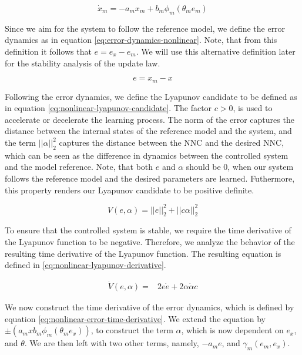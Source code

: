 \begin{equation}
    \dot x_m = -a_mx_m + b_m\phi_m(\theta_m e_m)
    \label{eq:first-order-ref}
\end{equation}

Since we aim for the system to follow the reference model, we define the error dynamics as in equation \eqref{eq:error-dynamics-nonlinear}. Note, that from this definition it follows that $e=e_x-e_m$. We will use this alternative definition later for the stability analysis of the update law.

\begin{equation}
    e=x_m-x
    \label{eq:error-dynamics-nonlinear}
\end{equation}

Following the error dynamics, we define the Lyapunov candidate to be defined as in equation \eqref{eq:nonlinear-lyapunov-candidate}. The factor $c>0$, is used to accelerate or decelerate the learning process. The norm of the error captures the distance between the internal states of the reference model and the system, and the term $||\alpha||_2^2$ captures the distance between the NNC and the desired NNC, which can be seen as the difference in dynamics between the controlled system and the model reference. Note, that both $e$ and $\alpha$ should be $0$, when our system follows the reference model and the desired parameters are learned. Futhermore, this property renders our Lyapunov candidate to be positive definite.

\begin{equation}
    V(e, \alpha) =||e||_2^2 + ||c \alpha||_2^2
    \label{eq:nonlinear-lyapunov-candidate}
\end{equation}

To ensure that the controlled system is stable, we require the time derivative of the Lyapunov function to be negative. Therefore, we analyze the behavior of the resulting time derivative of the Lyapunov function. The resulting equation is defined in \eqref{eq:nonlinear-lyapunov-derivative}.

\begin{equation}
    \begin{aligned}
    \dot V(e, \alpha) = & 2e\dot e + 2\alpha \dot \alpha c
    \end{aligned}
    \label{eq:nonlinear-lyapunov-derivative}
\end{equation}

We now construct the time derivative of the error dynamics, which is defined by equation \eqref{eq:nonlinear-error-time-derivative}. We extend the equation by $\pm (a_mx b_m \phi_m(\theta_m e_x))$, to construct the term $\alpha$, which is now dependent on $e_x$, and $\theta$. We are then left with two other terms, namely, $-a_me$, and $\gamma_m(e_m, e_x)$.

